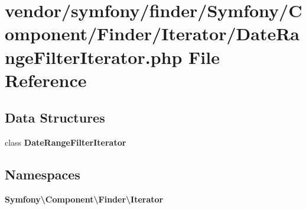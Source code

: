 \section{vendor/symfony/finder/\+Symfony/\+Component/\+Finder/\+Iterator/\+Date\+Range\+Filter\+Iterator.php File Reference}
\label{_date_range_filter_iterator_8php}
\subsection*{Data Structures}
\begin{DoxyCompactItemize}
\item 
class {\bf Date\+Range\+Filter\+Iterator}
\end{DoxyCompactItemize}
\subsection*{Namespaces}
\begin{DoxyCompactItemize}
\item 
 {\bf Symfony\textbackslash{}\+Component\textbackslash{}\+Finder\textbackslash{}\+Iterator}
\end{DoxyCompactItemize}
